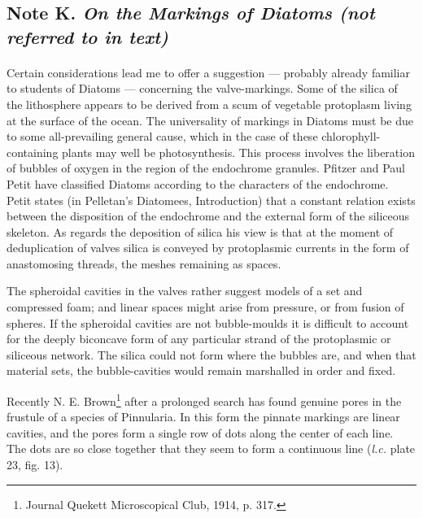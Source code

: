 \documentclass[a4paper, 12pt, oneside]{article}
\begin{document}
\subsection{Note K. \emph{On the Markings of Diatoms (not referred to in text)}}
\paragraph{}
Certain considerations lead me to offer a suggestion --- probably already familiar to students of Diatoms --- concerning the valve-markings. Some of the silica of the lithosphere appears to be derived from a scum of vegetable protoplasm living at the surface of the ocean. The universality of markings in Diatoms must be due to some all-prevailing general cause, which in the case of these chlorophyll-containing plants may well be photosynthesis. This process involves the liberation of bubbles of oxygen in the region of the endochrome granules. Pfitzer and Paul Petit have classified Diatoms according to the characters of the endochrome. Petit states (in Pelletan's Diatomees, Introduction) that a constant relation exists between the disposition of the endochrome and the external form of the siliceous skeleton. As regards the deposition of silica his view is that at the moment of deduplication of valves silica is conveyed by protoplasmic currents in the form of anastomosing threads, the meshes remaining as spaces.

The spheroidal cavities in the valves rather suggest models of a set and compressed foam; and linear spaces might arise from pressure, or from fusion of spheres. If the spheroidal cavities are not bubble-moulds it is difficult to account for the deeply biconcave form of any particular strand of the protoplasmic or siliceous network. The silica could not form where the bubbles are, and when that material sets, the bubble-cavities would remain marshalled in order and fixed.

Recently N. E. Brown\footnote{Journal Quekett Microscopical Club, 1914, p. 317.} after a prolonged search has found genuine pores in the frustule of a species of Pinnularia. In this form the pinnate markings are linear cavities, and the pores form a single row of dots along the center of each line. The dots are so close together that they seem to form a continuous line (\emph{l.c.} plate 23, fig. 13).
\end{document}
